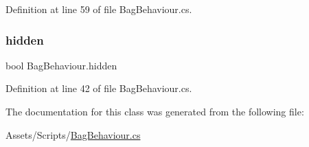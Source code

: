 Definition at line 59 of file Bag\+Behaviour.\+cs.

\mbox{\label{class_bag_behaviour_a20616261b25fffc37c9b9d68c3994bbe}} 
\subsubsection{\texorpdfstring{hidden}{hidden}}
{\footnotesize\ttfamily bool Bag\+Behaviour.\+hidden\hspace{0.3cm}{\ttfamily [get]}}



Definition at line 42 of file Bag\+Behaviour.\+cs.



The documentation for this class was generated from the following file\+:\begin{DoxyCompactItemize}
\item 
Assets/\+Scripts/\mbox{\hyperlink{_bag_behaviour_8cs}{Bag\+Behaviour.\+cs}}\end{DoxyCompactItemize}
